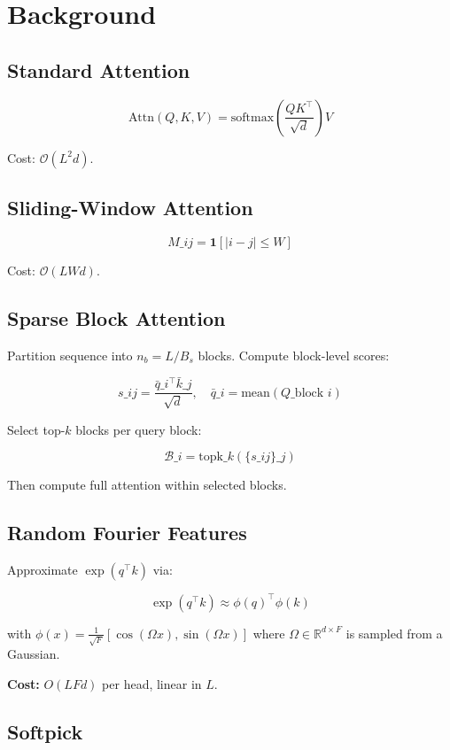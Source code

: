 
\section{Background}

\subsection{Standard Attention}

\[
\text{Attn}(Q, K, V) = \text{softmax}\!\left(\frac{QK^\top}{\sqrt{d}}\right)V
\tag{3.1}
\]

Cost: $\mathcal{O}(L^2 d)$.

\subsection{Sliding-Window Attention}

\[
M\_{ij} = \mathbf{1}[|i - j| \leq W]
\tag{3.2}
\]

Cost: $\mathcal{O}(L W d)$.

\subsection{Sparse Block Attention}

Partition sequence into $n_b = L / B_s$ blocks. Compute block-level scores:

\[
s\_{ij} = \frac{\bar{q}\_i^\top \bar{k}\_j}{\sqrt{d}}, \quad \bar{q}\_i = \text{mean}(Q\_{\text{block } i})
\tag{3.3}
\]

Select top-$k$ blocks per query block:

\[
\mathcal{B}\_i = \text{topk}\_{k}(\{s\_{ij}\}\_j)
\tag{3.4}
\]

Then compute full attention within selected blocks.

\subsection{Random Fourier Features}

Approximate $\exp(q^\top k)$ via:

\[
\exp(q^\top k) \approx \phi(q)^\top \phi(k)
\tag{3.5}
\]

with $\phi(x) = \frac{1}{\sqrt{F}} [\cos(\Omega x), \sin(\Omega x)]$ where 
$\Omega \in \mathbb{R}^{d \times F}$ is sampled from a Gaussian.

\textbf{Cost:} $O(L F d)$ per head, linear in $L$.

\subsection{Softpick}

